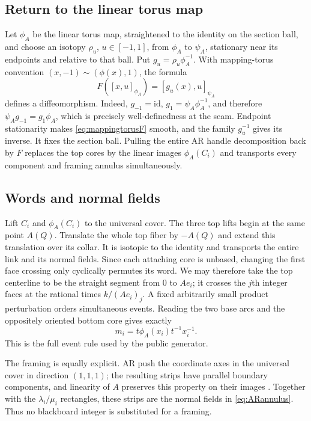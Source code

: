 \documentclass[11pt]{amsart}
\theoremstyle{definition}
\theoremstyle{remark}
\begin{document}
\subsection{Return to the linear torus map}

Let $\phi_A$ be the linear torus map, straightened to the identity on the
section ball, and choose an isotopy $\rho_u$, $u\in[-1,1]$, from $\phi_A$ to
$\psi_A$, stationary near its endpoints and relative to that ball.  Put
$g_u=\rho_u\phi_A^{-1}$.  With mapping-torus convention
$(x,-1)\sim(\phi(x),1)$, the formula
\begin{equation}\label{eq:mappingtorusF}
F([x,u]_{\phi_A})=[g_u(x),u]_{\psi_A}
\end{equation}
defines a diffeomorphism.  Indeed, $g_{-1}=\mathrm{id}$,
$g_1=\psi_A\phi_A^{-1}$, and therefore
$\psi_Ag_{-1}=g_1\phi_A$, which is precisely well-definedness at the seam.
Endpoint stationarity makes \eqref{eq:mappingtorusF} smooth, and the family
$g_u^{-1}$ gives its inverse.  It fixes the section ball.  Pulling the entire
AR handle decomposition back by $F$ replaces the top cores by the linear
images $\phi_A(C_i)$ and transports every component and framing annulus
simultaneously.

\subsection{Words and normal fields}

Lift $C_i$ and $\phi_A(C_i)$ to the universal cover.  The three top lifts
begin at the same point $A(Q)$.  Translate the whole top fiber by $-A(Q)$ and
extend this translation over its collar.  It is isotopic to the identity and
transports the entire link and its normal fields.  Since each attaching core
is unbased, changing the first face crossing only cyclically permutes its
word.  We may therefore take the top centerline to be the straight segment
from $0$ to $Ae_i$; it crosses the $j$th integer faces at
the rational times $k/(Ae_i)_j$.  A fixed arbitrarily small product
perturbation orders simultaneous events.  Reading the two base arcs and the
oppositely oriented bottom core gives exactly
\begin{equation}\label{eq:actualword}
m_i=t\phi_A(x_i)t^{-1}x_i^{-1}.
\end{equation}
This is the full event rule used by the public generator.

The framing is equally explicit.  AR push the coordinate axes in the
universal cover in direction $(1,1,1)$; the resulting strips have parallel
boundary components, and linearity of $A$ preserves this property on their
images \cite[pp.~16--17]{AitchisonRubinstein1984}.  Together with the
$\lambda_i/\mu_i$ rectangles, these strips are the normal fields in
\eqref{eq:ARannulus}.  Thus no blackboard integer is substituted for a
framing.
\end{document}
